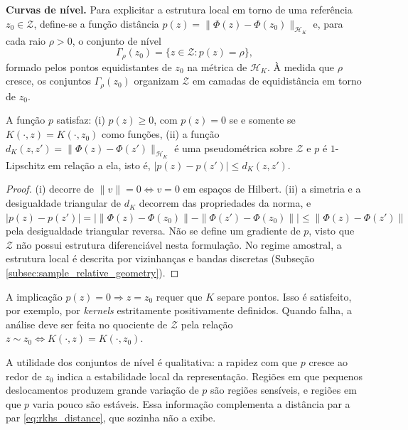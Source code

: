 \textbf{Curvas de nível.} Para explicitar a estrutura local em torno de uma referência $z_0 \in \mathcal{Z}$, define-se a função distância $p(z) = \|\Phi(z) - \Phi(z_0)\|_{\mathcal{H}_K}$ e, para cada raio $\rho > 0$, o conjunto de nível
\begin{equation}\label{eq:level_curve}
    \Gamma_\rho(z_0) = \{ z \in \mathcal{Z} : p(z) = \rho \},
\end{equation}
formado pelos pontos equidistantes de $z_0$ na métrica de $\mathcal{H}_K$. À medida que $\rho$ cresce, os conjuntos $\Gamma_\rho(z_0)$ organizam $\mathcal{Z}$ em camadas de equidistância em torno de $z_0$.
 
\begin{proposition}[Propriedades de $p$]\label{prop:dist_props}
A função $p$ satisfaz: \textnormal{(i)} $p(z) \geq 0$, com $p(z) = 0$ se e somente se $K(\cdot, z) = K(\cdot, z_0)$ como funções, \textnormal{(ii)} a função $d_K(z,z')=\|\Phi(z)-\Phi(z')\|_{\mathcal{H}_K}$ é uma pseudométrica sobre $\mathcal{Z}$ e $p$ é $1$-Lipschitz em relação a ela, isto é, $|p(z)-p(z')|\leq d_K(z,z')$.
\end{proposition}
 
\begin{proof}
(i) decorre de $\|v\| = 0 \iff v = 0$ em espaços de Hilbert. (ii) a simetria e a desigualdade triangular de $d_K$ decorrem das propriedades da norma, e $|p(z)-p(z')|=\big|\|\Phi(z)-\Phi(z_0)\|-\|\Phi(z')-\Phi(z_0)\|\big|\leq\|\Phi(z)-\Phi(z')\|$ pela desigualdade triangular reversa. Não se define um gradiente de $p$, visto que $\mathcal{Z}$ não possui estrutura diferenciável nesta formulação. No regime amostral, a estrutura local é descrita por vizinhanças e bandas discretas (Subseção \ref{subsec:sample_relative_geometry}).
\end{proof}
 
\begin{remark}\label{rem:point_sep}
A implicação $p(z) = 0 \Rightarrow z = z_0$ requer que $K$ separe pontos. Isso é satisfeito, por exemplo, por \textit{kernels} estritamente positivamente definidos. Quando falha, a análise deve ser feita no quociente de $\mathcal{Z}$ pela relação $z \sim z_0 \iff K(\cdot, z) = K(\cdot, z_0)$.
\end{remark}
 
A utilidade dos conjuntos de nível é qualitativa: a rapidez com que $p$ cresce ao redor de $z_0$ indica a estabilidade local da representação. Regiões em que pequenos deslocamentos produzem grande variação de $p$ são regiões sensíveis, e regiões em que $p$ varia pouco são estáveis. Essa informação complementa a distância par a par \eqref{eq:rkhs_distance}, que sozinha não a exibe.
 
